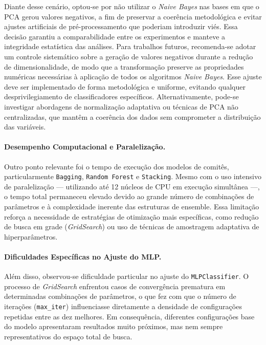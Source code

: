 \documentclass[12pt]{article}
\begin{document}
Diante desse cenário, optou-se por não utilizar o \textit{Naive Bayes} nas bases em que o PCA gerou valores negativos, a fim de preservar a coerência metodológica e evitar ajustes artificiais de pré-processamento que poderiam introduzir viés. Essa decisão garantiu a comparabilidade entre os experimentos e manteve a integridade estatística das análises.  
Para trabalhos futuros, recomenda-se adotar um controle sistemático sobre a geração de valores negativos durante a redução de dimensionalidade, de modo que a transformação preserve as propriedades numéricas necessárias à aplicação de todos os algoritmos \textit{Naive Bayes}. Esse ajuste deve ser implementado de forma metodológica e uniforme, evitando qualquer desprivilegiamento de classificadores específicos. Alternativamente, pode-se investigar abordagens de normalização adaptativa ou técnicas de PCA não centralizadas, que mantêm a coerência dos dados sem comprometer a distribuição das variáveis.

\paragraph{Desempenho Computacional e Paralelização.}

Outro ponto relevante foi o tempo de execução dos modelos de comitês, particularmente \texttt{Bagging}, \texttt{Random Forest} e \texttt{Stacking}. Mesmo com o uso intensivo de paralelização — utilizando até 12 núcleos de CPU em execução simultânea —, o tempo total permaneceu elevado devido ao grande número de combinações de parâmetros e à complexidade inerente das estruturas de ensemble. Essa limitação reforça a necessidade de estratégias de otimização mais específicas, como redução de busca em grade (\textit{GridSearch}) ou uso de técnicas de amostragem adaptativa de hiperparâmetros.

\paragraph{Dificuldades Específicas no Ajuste do MLP.}

Além disso, observou-se dificuldade particular no ajuste do \texttt{MLPClassifier}. O processo de \textit{GridSearch} enfrentou casos de convergência prematura em determinadas combinações de parâmetros, o que fez com que o número de iterações (\texttt{max\_iter}) influenciasse diretamente a densidade de configurações repetidas entre as dez melhores. Em consequência, diferentes configurações base do modelo apresentaram resultados muito próximos, mas nem sempre representativos do espaço total de busca.  
\end{document}
